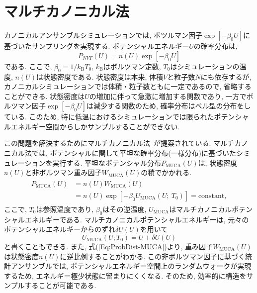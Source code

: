 \section{マルチカノニカル法}
カノニカルアンサンブルシミュレーションでは, ボツルマン因子$\exp[-\beta_{0}U]$に基づいたサンプリングを実現する. 
ポテンシャルエネルギー$U$の確率分布は, 
\begin{equation}
  P_{NVT}(U) = n(U) \exp[-\beta_{0}U]
\end{equation}
である. ここで, $\beta_{0} = 1/k_{\mathrm{B}}T_{0}$, $k_{\mathrm{B}}$はボルツマン定数, $T_{0}$はシミュレーションの温度, 
$n(U)$は状態密度である. 状態密度は本来, 体積$V$と粒子数$N$にも依存するが, カノニカルシミュレーションでは体積・粒子数ともに一定であるので, 省略することができる. 
状態密度は$U$の増加に伴って急激に増加する関数であり, 一方でボルツマン因子$\exp[-\beta_{0}U]$は減少する関数のため, 確率分布はベル型の分布をしている. 
このため, 特に低温におけるシミュレーションでは限られたポテンシャルエネルギー空間からしかサンプルすることができない. 

この問題を解決するためにマルチカノニカル法~\cite{Berg1991,Berg1992a,Hansmann1996,Nakajima1997}が提案されている. 
マルチカノニカル法では, ポテンシャルに関して平坦な確率分布(一様分布)に基づいたシミュレーションを実行する. 
平坦なポテンシャル分布$P_{\mathrm{MUCA}}(U)$は, 状態密度$n(U)$と非ボルツマン重み因子$W_{\mathrm{MUCA}}(U)$の積でかかれる. 
\begin{align}
    \begin{split}
    P_{\mathrm{MUCA}}(U) &=
    n(U) W_{\mathrm{MUCA}} (U) \\ &=
    n(U) \exp[-\beta_{0} U_{\mathrm{MUCA}}(U;~T_{0})] = \mathrm{constant},
    \end{split}
    \label{Eq:ProbDist-MUCA}
\end{align}
ここで, $T_{0}$は参照温度であり, $\beta_{0}$はその逆温度, $U_{\mathrm{MUCA}}$はマルチカノニカルポテンシャルエネルギーである. 
マルチカノニカルポテンシャルエネルギーは, 元々のポテンシャルエネルギーからのずれ$\delta U(U)$を用いて
\begin{equation}
  U_{\mathrm{MUCA}}(U;T_{0}) = U + \delta U(U)
\end{equation}
と書くこともできる. 
また, 式(\ref{Eq:ProbDist-MUCA})より, 重み因子$W_{\mathrm{MUCA}}(U)$は状態密度$n(U)$に逆比例することがわかる. 
この非ボルツマン因子に基づく統計アンサンブルでは, ポテンシャルエネルギー空間上のランダムウォークが実現するため, エネルギー極少状態に留まりにくくなる. 
そのため, 効率的に構造をサンプルすることが可能である. 

